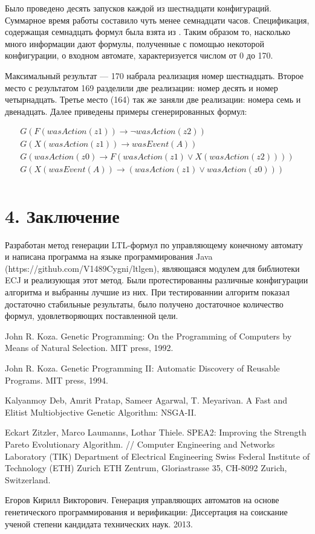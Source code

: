 \documentclass[12pt,fleqn]{article}
\begin{document}
Было проведено десять запусков каждой из шестнадцати конфигураций. Суммарное время работы составило чуть менее семнадцати часов.
Спецификация, содержащая семнадцать формул была взята из \cite{eg}.
Таким образом то, насколько много информации дают формулы, полученные с помощью некоторой конфигурации, о входном автомате,
характеризуется числом от 0 до 170.

Максимальный результат --- 170 набрала реализация номер шестнадцать. Второе место с результатом 169 разделили две реализации:
номер десять и номер четырнадцать. Третье место (164) так же заняли две реализации: номера семь и двенадцать.
Далее приведены примеры сгенерированных формул: 

\begin{multline*}
G(F(wasAction(z1)) \rightarrow \lnot wasAction(z2))\\
G(X(wasAction(z1)) \rightarrow wasEvent(A))\\
G(wasAction(z0) \rightarrow F(wasAction(z1) \vee X(wasAction(z2))))\\
G(X(wasEvent(A)) \rightarrow (wasAction(z1) \vee wasAction(z0)))\\
\end{multline*}

\section*{4. Заключение}

Разработан метод генерации LTL-формул по управляющему конечному автомату и написана программа на языке программирования Java
(https://github.com/V1489Cygni/ltlgen), являющаяся модулем для библиотеки ECJ и реализующая этот метод.
Были протестированны различные конфигурации алгоритма и выбранны лучшие из них. При тестированнии алгоритм показал
достаточно стабильные результаты, было получено достаточное количество формул, удовлетворяющих поставленной цели.

\begin{thebibliography}{5}

John R. Koza. Genetic Programming: On the Programming of Computers by Means of Natural Selection. MIT press, 1992.

John R. Koza. Genetic Programming II: Automatic Discovery of Reusable Programs. MIT press, 1994.

Kalyanmoy Deb, Amrit Pratap, Sameer Agarwal, T. Meyarivan. A Fast and Elitist Multiobjective Genetic Algorithm: NSGA-II.

Eckart Zitzler, Marco Laumanns, Lothar Thiele. SPEA2: Improving the Strength Pareto Evolutionary Algorithm. //
Computer Engineering and Networks Laboratory (TIK)
Department of Electrical Engineering
Swiss Federal Institute of Technology (ETH) Zurich
ETH Zentrum, Gloriastrasse 35, CH-8092 Zurich, Switzerland.

Егоров Кирилл Викторович. Генерация управляющих автоматов на основе генетического программирования и верификации: 
Диссертация на соискание ученой степени кандидата технических наук. 2013.   

\end{thebibliography}
\end{document}

